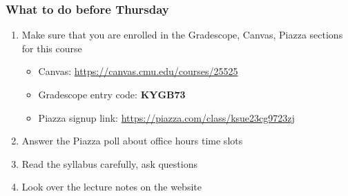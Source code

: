 \documentclass[10pt]{beamer}
\begin{document}

\begin{frame}

\frametitle{What to do before Thursday}

\begin{enumerate}
  \item Make sure that you are enrolled in the Gradescope, Canvas, Piazza sections for this course
  \begin{itemize}
    \item Canvas: \url{https://canvas.cmu.edu/courses/25525}
    \item Gradescope entry code: \textbf{KYGB73}
    \item Piazza signup link: \url{https://piazza.com/class/ksue23cg9723zj}
  \end{itemize}
  \item Answer the Piazza poll about office hours time slots
  \item Read the syllabus carefully, ask questions
  \item Look over the lecture notes on the website
\end{enumerate}

\end{frame}
\end{document}
